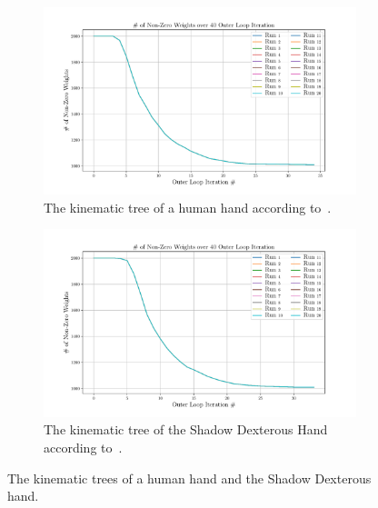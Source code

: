\begin{figure}[!h]
	\centering
	\begin{subfigure}[b]{0.48\textwidth}
		\centering
		\includegraphics[width=\textwidth]{chapters/2-pose-estimation/fig/GNC-TLS-w-run-30-conv.pdf}
		\caption{The kinematic tree of a human hand according to~\cite{grasp-synthesis-algorithms-for-multifingered-robot-hands}.}
		\label{app:GNC-TLS-w-run-30-conv}
	\end{subfigure}
	\hfill
	\begin{subfigure}[b]{0.48\textwidth}
		\centering
		\includegraphics[width=\textwidth]{chapters/2-pose-estimation/fig/GNC-TLS-w-run-40-conv.pdf}
		\caption{The kinematic tree of the Shadow Dexterous Hand according to~\cite{robot-hand-kinematics}. \newline}
		\label{app:GNC-TLS-w-run-40-conv}
	\end{subfigure}
	\caption{The kinematic trees of a human hand and the Shadow Dexterous hand.}
	\label{app:GNC-TLS-w-run-30-40-conv}
\end{figure}
